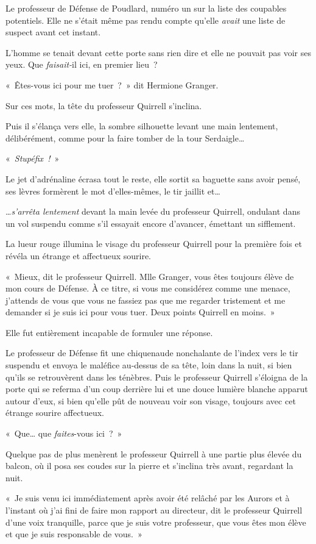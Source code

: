 Le professeur de Défense de Poudlard, numéro un sur la liste des coupables potentiels. Elle ne s'était même pas rendu compte qu'elle \emph{avait} une liste de suspect avant cet instant.

L'homme se tenait devant cette porte sans rien dire et elle ne pouvait pas voir ses yeux. Que \emph{faisait-}il ici, en premier lieu~?

«~Êtes-vous ici pour me tuer~?~» dit Hermione Granger.

Sur ces mots, la tête du professeur Quirrell s'inclina.

Puis il s'élança vers elle, la sombre silhouette levant une main lentement, délibérément, comme pour la faire tomber de la tour Serdaigle…

«~\emph{Stupéfix~!}~»

Le jet d'adrénaline écrasa tout le reste, elle sortit sa baguette sans avoir pensé, ses lèvres formèrent le mot d'elles-mêmes, le tir jaillit et…

…\emph{s'arrêta lentement} devant la main levée du professeur Quirrell, ondulant dans un vol suspendu comme s'il essayait encore d'avancer, émettant un sifflement.

La lueur rouge illumina le visage du professeur Quirrell pour la première fois et révéla un étrange et affectueux sourire.

«~Mieux, dit le professeur Quirrell. Mlle Granger, vous êtes toujours élève de mon cours de Défense. À ce titre, si vous me considérez comme une menace, j'attends de vous que vous ne fassiez pas que me regarder tristement et me demander si je suis ici pour vous tuer. Deux points Quirrell en moins.~»

Elle fut entièrement incapable de formuler une réponse.

Le professeur de Défense fit une chiquenaude nonchalante de l'index vers le tir suspendu et envoya le maléfice au-dessus de sa tête, loin dans la nuit, si bien qu'ils se retrouvèrent dans les ténèbres. Puis le professeur Quirrell s'éloigna de la porte qui se referma d'un coup derrière lui et une douce lumière blanche apparut autour d'eux, si bien qu'elle pût de nouveau voir son visage, toujours avec cet étrange sourire affectueux.

«~Que… que \emph{faites}-vous ici~?~»

Quelque pas de plus menèrent le professeur Quirrell à une partie plus élevée du balcon, où il posa ses coudes sur la pierre et s'inclina très avant, regardant la nuit.

«~Je suis venu ici immédiatement après avoir été relâché par les Aurors et à l'instant où j'ai fini de faire mon rapport au directeur, dit le professeur Quirrell d'une voix tranquille, parce que je suis votre professeur, que vous êtes mon élève et que je suis responsable de vous.~»

